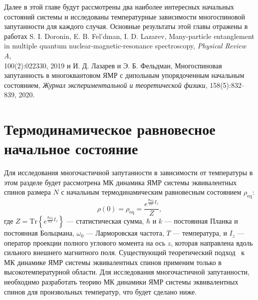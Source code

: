 Далее в этой главе будут рассмотрены два наиболее интересных начальных состояний системы
и исследованы температурные зависимости многоспиновой запутанности для каждого случая. Основные результаты этой главы отражены в работах 
S. I. Doronin, E. B. Fel'dman,  I. D. Lazarev, Many-particle entanglement in multiple quantum nuclear-magnetic-resonance spectroscopy, \textit{Physical Review A}, \\ 100(2):022330, 2019 
и
И. Д. Лазарев и Э. Б. Фельдман,
Многоспиновая запутанность в многоквантовом ЯМР с дипольным упорядоченным начальным состоянием,
\textit{Журнал экспериментальной и теоретической физики}, 158(5):832–839, 2020.


\section{Термодинамическое равновесное начальное состояние}
\label{sec:nanopora-thermodynamic-equilibrium}

Для исследования многочастичной запутанности в зависимости от температуры
в этом разделе будет рассмотрена МК динамика ЯМР
системы эквивалентных спинов размера $N$
с начальным термодинамическим равновесным состоянием $\rho_\mathrm{eq}$:
%
\begin{equation}\label{eq:rho_eq}
  \rho(0) = \rho_{\mathrm{eq}} = \dfrac{e^{\frac{\hbar\omega_{0}}{kT} I_z}}{Z},
\end{equation}
%
где $Z =\mathrm{Tr}\left\{e^{\frac{\hbar\omega_{0}}{kT} I_z}\right\}$ --- статистическая сумма,
$\hbar$ и $k$ ---  постоянная Планка и постоянная Больцмана,
$\omega_0$ --- Ларморовская частота,
$T$ --- температура,
и $I_z$ --- оператор проекции полного углового момента на ось $z$,
которая направлена вдоль сильного внешнего магнитного поля.
%
Существующий теоретический подход~\cite{Doronin2009, Doronin2011}
к МК динамике ЯМР системы эквивалентных спинов
применим только в высокотемпературной области.
Для исследования многочастичной запутанности,
необходимо разработать теорию МК динамики ЯМР системы эквивалентных спинов
для произвольных температур,
что будет сделано ниже.

